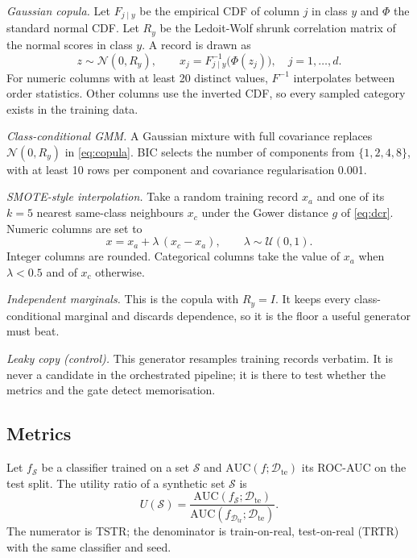 \documentclass[journal]{IEEEtran}
\begin{document}
\emph{Gaussian copula.} Let $F_{j\mid y}$ be the empirical CDF of column $j$ in class $y$ and $\Phi$ the standard normal CDF. Let $R_y$ be the Ledoit-Wolf shrunk correlation matrix of the normal scores in class $y$. A record is drawn as
\begin{equation}
z\sim\mathcal{N}(0,R_y),\qquad x_j=F_{j\mid y}^{-1}\bigl(\Phi(z_j)\bigr),\quad j=1,\dots,d.
\label{eq:copula}
\end{equation}
For numeric columns with at least 20 distinct values, $F^{-1}$ interpolates between order statistics. Other columns use the inverted CDF, so every sampled category exists in the training data.

\emph{Class-conditional GMM.} A Gaussian mixture with full covariance replaces $\mathcal{N}(0,R_y)$ in \eqref{eq:copula}. BIC selects the number of components from $\{1,2,4,8\}$, with at least 10 rows per component and covariance regularisation 0.001.

\emph{SMOTE-style interpolation.} Take a random training record $x_a$ and one of its $k=5$ nearest same-class neighbours $x_c$ under the Gower distance $g$ of \eqref{eq:dcr}. Numeric columns are set to
\begin{equation}
x=x_a+\lambda\,(x_c-x_a),\qquad \lambda\sim\mathcal{U}(0,1).
\label{eq:smote}
\end{equation}
Integer columns are rounded. Categorical columns take the value of $x_a$ when $\lambda<0.5$ and of $x_c$ otherwise.

\emph{Independent marginals.} This is the copula with $R_y=I$. It keeps every class-conditional marginal and discards dependence, so it is the floor a useful generator must beat.

\emph{Leaky copy (control).} This generator resamples training records verbatim. It is never a candidate in the orchestrated pipeline; it is there to test whether the metrics and the gate detect memorisation.

\subsection{Metrics}
Let $f_{\mathcal{S}}$ be a classifier trained on a set $\mathcal{S}$ and $\mathrm{AUC}(f;\mathcal{D}_{\mathrm{te}})$ its ROC-AUC on the test split. The utility ratio of a synthetic set $\mathcal{S}$ is
\begin{equation}
U(\mathcal{S})=\frac{\mathrm{AUC}(f_{\mathcal{S}};\mathcal{D}_{\mathrm{te}})}{\mathrm{AUC}(f_{\mathcal{D}_{\mathrm{tr}}};\mathcal{D}_{\mathrm{te}})}.
\label{eq:utility}
\end{equation}
The numerator is TSTR; the denominator is train-on-real, test-on-real (TRTR) with the same classifier and seed.
\end{document}
